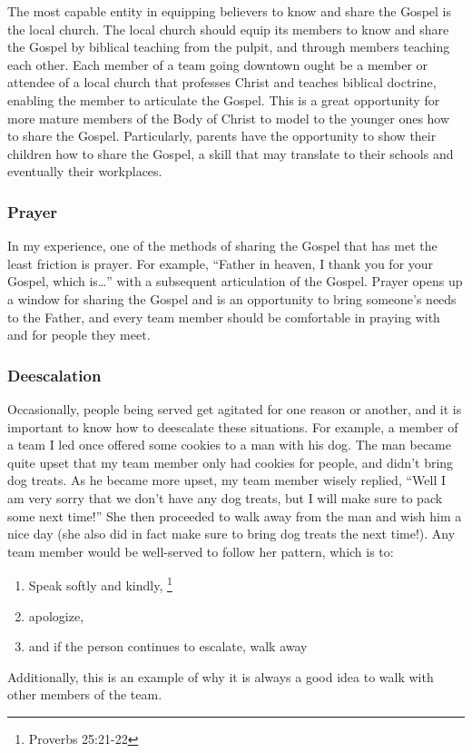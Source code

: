 \documentclass[12pt]{article}
\begin{document}
    \qGreatCommission
    The most capable entity in equipping believers to know and share the Gospel is the local church.
    The local church should equip its members to know and share the Gospel by biblical teaching from the pulpit, and through members teaching each other.
    Each member of a team going downtown ought be a member or attendee of a local church that professes Christ and teaches biblical doctrine, enabling the member to articulate the Gospel.
    This is a great opportunity for more mature members of the Body of Christ to model to the younger ones how to share the Gospel.
    Particularly, parents have the opportunity to show their children how to share the Gospel, a skill that may translate to their schools and eventually their workplaces.

\subsubsection{Prayer}

    In my experience, one of the methods of sharing the Gospel that has met the least friction is prayer.
    For example, ``Father in heaven, I thank you for your Gospel, which is\dots'' with a subsequent articulation of the Gospel.
    Prayer opens up a window for sharing the Gospel and is an opportunity to bring someone's needs to the Father, and every team member should be comfortable in praying with and for people they meet.

\subsubsection{Deescalation}

    Occasionally, people being served get agitated for one reason or another, and it is important to know how to deescalate these situations.
    For example, a member of a team I led once offered some cookies to a man with his dog.
    The man became quite upset that my team member only had cookies for people, and didn't bring dog treats.
    As he became more upset, my team member wisely replied, ``Well I am very sorry that we don't have any dog treats, but I will make sure to pack some next time!''
    She then proceeded to walk away from the man and wish him a nice day (she also did in fact make sure to bring dog treats the next time!).
    Any team member would be well-served to follow her pattern, which is to:
    \begin{enumerate}
        \item Speak softly and kindly,
            \footnote{Proverbs 25:21-22}
        \item apologize,
        \item and if the person continues to escalate, walk away
    \end{enumerate}
    Additionally, this is an example of why it is always a good idea to walk with other members of the team.
\end{document}
